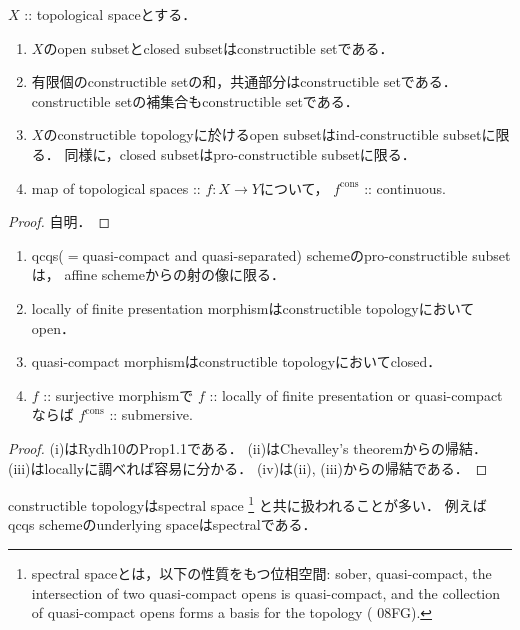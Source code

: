 \documentclass[a4paper, dvipdfmx]{jsarticle}
\newcommand{\cons}{\mathrm{cons}}
\begin{document}
\begin{Prop}
    $X$ :: topological spaceとする．
    \begin{enumerate}
    \item
        $X$のopen subsetとclosed subsetはconstructible setである．

    \item
        有限個のconstructible setの和，共通部分はconstructible setである．
        constructible setの補集合もconstructible setである．

    \item
        $X$のconstructible topologyに於けるopen subsetはind-constructible subsetに限る．
        同様に，closed subsetはpro-constructible subsetに限る．

    \item
        map of topological spaces :: $f \colon X \to Y$について，
        $f^{\cons}$ :: continuous.
    \end{enumerate}
\end{Prop}
\begin{proof}
    自明．   
\end{proof}

\begin{Prop}
    \begin{enumerate}
    \item 
        qcqs($=$quasi-compact and quasi-separated) schemeのpro-constructible subsetは，
        affine schemeからの射の像に限る．

    \item
        locally of finite presentation morphismはconstructible topologyにおいてopen．

    \item
         quasi-compact morphismはconstructible topologyにおいてclosed．

    \item
        $f$ :: surjective morphismで
        $f$ :: locally of finite presentation or quasi-compactならば
        $f^{\cons}$ :: submersive.
    \end{enumerate}
\end{Prop}
\begin{proof}
    (i)はRydh10のProp1.1である．
    (ii)はChevalley's theoremからの帰結．
    (iii)はlocallyに調べれば容易に分かる．
    (iv)は(ii), (iii)からの帰結である．
\end{proof}

\begin{Remark}
    constructible topologyはspectral space
    \footnote
    {
        spectral spaceとは，以下の性質をもつ位相空間:
        sober, quasi-compact,
        the intersection of two quasi-compact opens is quasi-compact,
        and the collection of quasi-compact opens forms a basis for the topology
        (\cite{SP} 08FG).
    }
    と共に扱われることが多い．
    例えばqcqs schemeのunderlying spaceはspectralである．
\end{Remark}
\end{document}
